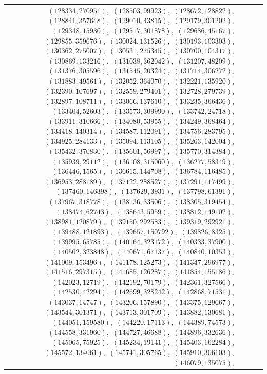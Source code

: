 \documentclass[11pt]{article}
\begin{document}
\begin{longtable}{@{}rrl>{\raggedright\arraybackslash}p{}@{}}
$(128334,270951)$,\allowbreak\ $(128503,99923)$,\allowbreak\ $(128672,128822)$,\allowbreak\ $(128841,357648)$,\allowbreak\ $(129010,43815)$,\allowbreak\ $(129179,301202)$,\allowbreak\ $(129348,15930)$,\allowbreak\ $(129517,301878)$,\allowbreak\ $(129686,45167)$,\allowbreak\ $(129855,359676)$,\allowbreak\ $(130024,131526)$,\allowbreak\ $(130193,103303)$,\allowbreak\ $(130362,275007)$,\allowbreak\ $(130531,275345)$,\allowbreak\ $(130700,104317)$,\allowbreak\ $(130869,133216)$,\allowbreak\ $(131038,362042)$,\allowbreak\ $(131207,48209)$,\allowbreak\ $(131376,305596)$,\allowbreak\ $(131545,20324)$,\allowbreak\ $(131714,306272)$,\allowbreak\ $(131883,49561)$,\allowbreak\ $(132052,364070)$,\allowbreak\ $(132221,135920)$,\allowbreak\ $(132390,107697)$,\allowbreak\ $(132559,279401)$,\allowbreak\ $(132728,279739)$,\allowbreak\ $(132897,108711)$,\allowbreak\ $(133066,137610)$,\allowbreak\ $(133235,366436)$,\allowbreak\ $(133404,52603)$,\allowbreak\ $(133573,309990)$,\allowbreak\ $(133742,24718)$,\allowbreak\ $(133911,310666)$,\allowbreak\ $(134080,53955)$,\allowbreak\ $(134249,368464)$,\allowbreak\ $(134418,140314)$,\allowbreak\ $(134587,112091)$,\allowbreak\ $(134756,283795)$,\allowbreak\ $(134925,284133)$,\allowbreak\ $(135094,113105)$,\allowbreak\ $(135263,142004)$,\allowbreak\ $(135432,370830)$,\allowbreak\ $(135601,56997)$,\allowbreak\ $(135770,314384)$,\allowbreak\ $(135939,29112)$,\allowbreak\ $(136108,315060)$,\allowbreak\ $(136277,58349)$,\allowbreak\ $(136446,1565)$,\allowbreak\ $(136615,144708)$,\allowbreak\ $(136784,116485)$,\allowbreak\ $(136953,288189)$,\allowbreak\ $(137122,288527)$,\allowbreak\ $(137291,117499)$,\allowbreak\ $(137460,146398)$,\allowbreak\ $(137629,3931)$,\allowbreak\ $(137798,61391)$,\allowbreak\ $(137967,318778)$,\allowbreak\ $(138136,33506)$,\allowbreak\ $(138305,319454)$,\allowbreak\ $(138474,62743)$,\allowbreak\ $(138643,5959)$,\allowbreak\ $(138812,149102)$,\allowbreak\ $(138981,120879)$,\allowbreak\ $(139150,292583)$,\allowbreak\ $(139319,292921)$,\allowbreak\ $(139488,121893)$,\allowbreak\ $(139657,150792)$,\allowbreak\ $(139826,8325)$,\allowbreak\ $(139995,65785)$,\allowbreak\ $(140164,323172)$,\allowbreak\ $(140333,37900)$,\allowbreak\ $(140502,323848)$,\allowbreak\ $(140671,67137)$,\allowbreak\ $(140840,10353)$,\allowbreak\ $(141009,153496)$,\allowbreak\ $(141178,125273)$,\allowbreak\ $(141347,296977)$,\allowbreak\ $(141516,297315)$,\allowbreak\ $(141685,126287)$,\allowbreak\ $(141854,155186)$,\allowbreak\ $(142023,12719)$,\allowbreak\ $(142192,70179)$,\allowbreak\ $(142361,327566)$,\allowbreak\ $(142530,42294)$,\allowbreak\ $(142699,328242)$,\allowbreak\ $(142868,71531)$,\allowbreak\ $(143037,14747)$,\allowbreak\ $(143206,157890)$,\allowbreak\ $(143375,129667)$,\allowbreak\ $(143544,301371)$,\allowbreak\ $(143713,301709)$,\allowbreak\ $(143882,130681)$,\allowbreak\ $(144051,159580)$,\allowbreak\ $(144220,17113)$,\allowbreak\ $(144389,74573)$,\allowbreak\ $(144558,331960)$,\allowbreak\ $(144727,46688)$,\allowbreak\ $(144896,332636)$,\allowbreak\ $(145065,75925)$,\allowbreak\ $(145234,19141)$,\allowbreak\ $(145403,162284)$,\allowbreak\ $(145572,134061)$,\allowbreak\ $(145741,305765)$,\allowbreak\ $(145910,306103)$,\allowbreak\ $(146079,135075)$,\allowbreak\ 
\end{longtable}
\end{document}
